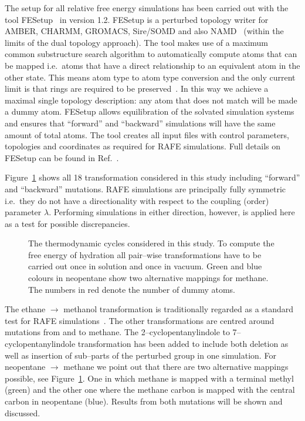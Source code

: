 \documentclass[journal=jctcce,manuscript=article]{achemso}
\begin{document}
The setup for all relative free energy simulations has been carried
out with the tool FESetup~\cite{loeffler_fesetup:_2015} in version
1.2.  FESetup is a perturbed topology writer for AMBER, CHARMM,
GROMACS, Sire/SOMD and also NAMD~\cite{JCC:JCC20289} (within the
limits of the dual topology approach).  The tool makes use of a
maximum common substructure search algorithm to automatically compute
atoms that can be mapped i.e.\ atoms that have a direct relationship
to an equivalent atom in the other state.  This means atom type to
atom type conversion and the only current limit is that rings are
required to be preserved~\cite{doi:10.1021/acs.jcim.5b00057}.  In this
way we achieve a maximal single topology description: any atom that
does not match will be made a dummy atom.  FESetup allows
equilibration of the solvated simulation systems and ensures that
``forward'' and ``backward'' simulations will have the same amount of
total atoms.  The tool creates all input files with control
parameters, topologies and coordinates as required for RAFE
simulations.  Full details on FESetup can be found in
Ref.~.

Figure~\ref{fig:cycles} shows all 18 transformation considered in this
study including ``forward'' and ``backward'' mutations.  RAFE
simulations are principally fully symmetric i.e.\ they do not have a
directionality with respect to the coupling (order) parameter
$\lambda$.  Performing simulations in either direction, however, is
applied here as a test for possible discrepancies.

\begin{figure}[ht]
  \caption{The thermodynamic cycles considered in this study.  To
    compute the free energy of hydration all pair--wise
    transformations have to be carried out once in solution and once
    in vacuum.  Green and blue colours in neopentane show two
    alternative mappings for methane.  The numbers in red denote the
    number of dummy atoms.}
  \label{fig:cycles}
\end{figure}

The ethane $\rightarrow$ methanol transformation is traditionally
regarded as a standard test for RAFE
simulations~\cite{doi:10.1063/1.449208, doi:10.1021/jp981629f}.  The
other transformations are centred around mutations from and to
methane.  The 2--cyclopentanylindole to 7--cyclopentanylindole
transformation has been added to include both deletion as well as
insertion of sub--parts of the perturbed group in one simulation.  For
neopentane $\rightarrow$ methane we point out that there are two
alternative mappings possible, see Figure~\ref{fig:cycles}.  One in
which methane is mapped with a terminal methyl (green) and the other
one where the methane carbon is mapped with the central carbon in
neopentane (blue).  Results from both mutations will be shown and
discussed.
\end{document}
